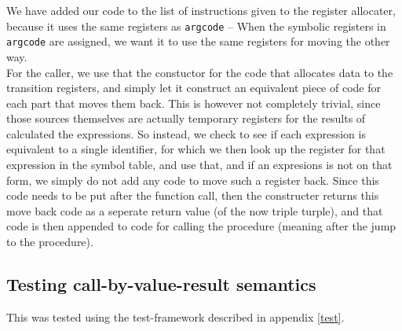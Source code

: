 \documentclass{article}
\begin{document}
We have added our code to the list of instructions given to the register allocater, because it uses the same
registers as \texttt{argcode} -- When the symbolic registers in \texttt{argcode} are assigned, we want it to
use the same registers for moving the other way.
\\
For the caller, we use that the constuctor for the code that allocates data to the transition registers,
and simply let it construct an equivalent piece of code for each part that moves them back.
This is however not completely trivial, since those sources themselves are actually temporary registers
for the results of calculated the expressions. So instead, we check to see if each expression is equivalent
to a single identifier, for which we then look up the register for that expression in the symbol table,
and use that, and if an expresions is not on that form, we simply do not add any code to move such a register back.
Since this code needs to be put after the function call, then the constructer returns this move back code as a seperate
return value (of the now triple turple), and that code is then appended to code for calling the procedure
(meaning after the jump to the procedure).

\subsection{Testing call-by-value-result semantics}
This was tested using the test-framework described in appendix \ref{test}.
\end{document}
